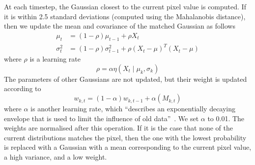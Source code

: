 \documentclass[conference]{IEEEtran}
\begin{document}
At each timestep, the Gaussian closest to the current pixel value is
computed. If it is within 2.5 standard deviations (computed using the
Mahalanobis distance), then we update the mean and covariance of the matched
Gaussian as follows
\begin{align}
  \mu_t&=(1-\rho)\mu_{t-1}+\rho X_t\\
  \sigma_t^2&=(1-\rho)\sigma_{t-1}^2+\rho(X_t-\mu)^T(X_t-\mu)
\end{align}
where $\rho$ is a learning rate
\begin{equation}
  \rho=\alpha\eta(X_t\mid \mu_k,\sigma_k)
\end{equation}
The parameters of other Gaussians are not updated, but their weight is updated
according to
\begin{equation}
  w_{k,t}=(1-\alpha)w_{k,t-1}+\alpha(M_{k,t})
\end{equation}
where $\alpha$ is another learning rate, which ``describes an exponentially
decaying envelope that is used to limit the influence of old
data''~\cite{zivkovic2004improved}. We set $\alpha$ to 0.01. The weights are
normalised after this operation. If it is the case that none of the current
distributions matches the pixel, then the one with the lowest probability is
replaced with a Gaussian with a mean corresponding to the current pixel value, a
high variance, and a low weight.
\end{document}
